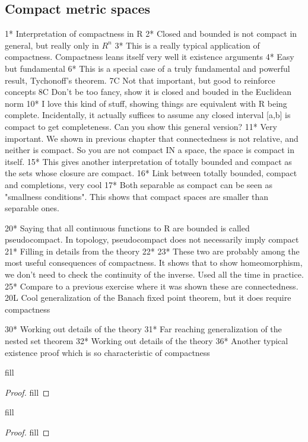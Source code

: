 \subsection{Compact metric spaces}

1* Interpretation of compactness in R
2* Closed and bounded is not compact in general, but really only in $R^n$
3* This is a really typical application of compactness. Compactness leans itself very well it existence arguments
4* Easy but fundamental 
6* This is a special case of a truly fundamental and powerful result, Tychonoff's theorem.
7C Not that important, but good to reinforce concepts
8C Don't be too fancy, show it is closed and bouded in the Euclidean norm
10* I love this kind of stuff, showing things are equivalent with R being complete. Incidentally, it actually suffices to assume any closed interval [a,b] is compact to get completeness. Can you show this general version?
11* Very important. We shown in previous chapter that connectedness is not relative, and neither is compact. So you are not compact IN a space, the space is compact in itself.
15* This gives another interpretation of totally bounded and compact as the sets whose closure are compact.
16* Link between totally bounded, compact and completions, very cool
17* Both separable as compact can be seen as "smallness conditions". This shows that compact spaces are smaller than separable ones.

20* Saying that all continuous functions to R are bounded is called pseudocompact. In topology, pseudocompact does not necessarily imply compact
21* Filling in details from the theory 
22*
23* These two are probably among the most useful consequences of compactness. It shows that to show homeomorphism, we don't need to check the continuity of the inverse. Used all the time in practice.
25* Compare to a previous exercise where it was shown these are connectedness.
20L Cool generalization of the Banach fixed point theorem, but it does require compactness

30* Working out details of the theory
31* Far reaching generalization of the nested set theorem 
32* Working out details of the theory
36* Another typical existence proof which is so characteristic of compactness 

\begin{exercise}{1}
fill
\end{exercise}
\begin{proof}
fill
\end{proof} 

\begin{exercise}{2}
fill
\end{exercise}
\begin{proof}
fill
\end{proof} 

